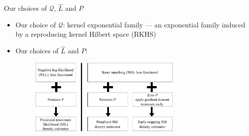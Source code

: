 \documentclass[aspectratio=169,xcolor=dvipsnames]{beamer}
\begin{document}
\begin{frame}{Our choices of $\mathcal{Q}$, $\widehat{L}$ and $P$}
	
	\begin{itemize}
		\item Our choice of $\mathcal{Q}$: kernel exponential family --- an exponential family induced by a reproducing kernel Hilbert space (RKHS)
		
		\vspace{5pt}
		
		\item Our choices of $\widehat{L}$ and $P$: 
		\vspace{10pt}
		\begin{figure}
			\centering
			\includegraphics[width=0.7\textwidth]{diagram-loss-pen.pdf}
		\end{figure}
		
%		
%			
%			
%			
	\end{itemize}
	
\end{frame}
\end{document}
